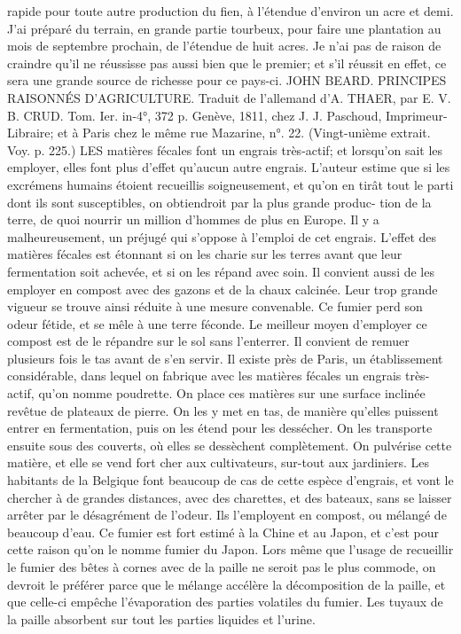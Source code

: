 \setcounter{page}{296} rapide pour toute autre production du fien, à l'étendue d'environ un acre et demi. J'ai préparé du terrain, en grande partie tourbeux, pour faire une plantation au mois de septembre prochain, de l'étendue de huit acres. Je n'ai pas de raison de craindre qu'il ne réussisse pas aussi bien que le premier; et s'il réussit en effet, ce sera une grande source de richesse pour ce pays-ci.
JOHN BEARD.
PRINCIPES RAISONNÉS D'AGRICULTURE. Traduit de l'allemand d'A. THAER, par E. V. B. CRUD. Tom. Ier. in-4°, 372 p. Genève, 1811, chez J. J. Paschoud, Imprimeur-Libraire; et à Paris chez le même rue Mazarine, n°. 22. (Vingt-unième extrait. Voy. p. 225.)
LES matières fécales font un engrais très-actif; et lorsqu'on sait les employer, elles font plus d'effet qu'aucun autre engrais. L'auteur estime que si les excrémens humains étoient recueillis soigneusement, et qu'on en tirât tout le parti dont ils sont susceptibles, on obtiendroit par la plus grande produc-\setcounter{page}{297} tion de la terre, de quoi nourrir un million d'hommes de plus en Europe. Il y a malheureusement, un préjugé qui s'oppose à l'emploi de cet engrais.
L'effet des matières fécales est étonnant si on les charie sur les terres avant que leur fermentation soit achevée, et si on les répand avec soin. Il convient aussi de les employer en compost avec des gazons et de la chaux calcinée. Leur trop grande vigueur se trouve ainsi réduite à une mesure convenable. Ce fumier perd son odeur fétide, et se mêle à une terre féconde. Le meilleur moyen d'employer ce compost est de le répandre sur le sol sans l'enterrer. Il convient de remuer plusieurs fois le tas avant de s'en servir.
Il existe près de Paris, un établissement considérable, dans lequel on fabrique avec les matières fécales un engrais très-actif, qu'on nomme poudrette. On place ces matières sur une surface inclinée revêtue de plateaux de pierre. On les y met en tas, de manière qu'elles puissent entrer en fermentation, puis on les étend pour les dessécher. On les transporte ensuite sous des couverts, où elles se dessèchent complètement. On pulvérise cette matière, et elle se vend fort cher aux cultivateurs, sur-tout aux jardiniers.\setcounter{page}{298} Les habitants de la Belgique font beaucoup de cas de cette espèce d’engrais, et vont le chercher à de grandes distances, avec des charettes, et des bateaux, sans se laisser arrêter par le désagrément de l’odeur. Ils l’employent en compost, ou mélangé de beaucoup d’eau. Ce fumier est fort estimé à la Chine et au Japon, et c’est pour cette raison qu’on le nomme fumier du Japon.
Lors même que l’usage de recueillir le fumier des bêtes à cornes avec de la paille ne seroit pas le plus commode, on devroit le préférer parce que le mélange accélère la décomposition de la paille, et que celle-ci empêche l’évaporation des parties volatiles du fumier. Les tuyaux de la paille absorbent sur tout les parties liquides et l’urine.
